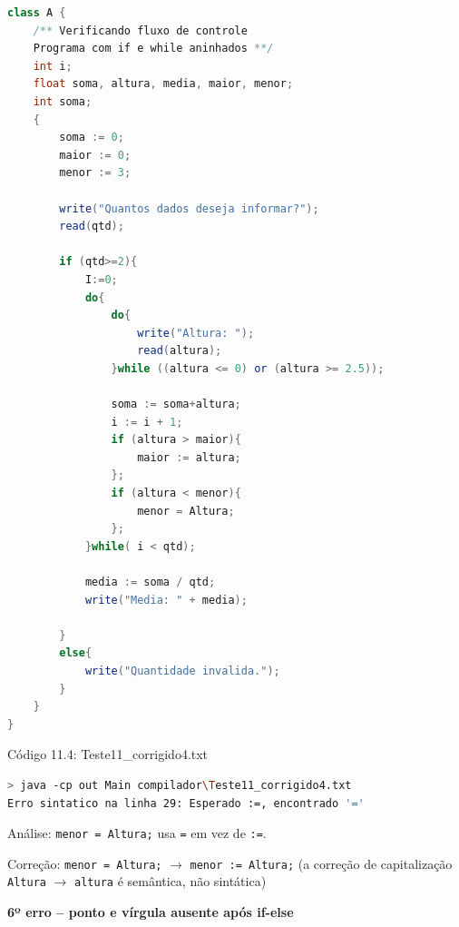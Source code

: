\documentclass[12pt,a4paper]{article}
\begin{document}
\begin{lstlisting}[language=Java]
class A {
    /** Verificando fluxo de controle
    Programa com if e while aninhados **/
    int i;
    float soma, altura, media, maior, menor;
    int soma;
    {
        soma := 0;
        maior := 0;
        menor := 3;

        write("Quantos dados deseja informar?");
        read(qtd);

        if (qtd>=2){
            I:=0;
            do{
                do{
                    write("Altura: ");
                    read(altura);
                }while ((altura <= 0) or (altura >= 2.5));

                soma := soma+altura;
                i := i + 1;
                if (altura > maior){
                    maior := altura;
                };
                if (altura < menor){
                    menor = Altura;
                };
            }while( i < qtd);

            media := soma / qtd;
            write("Media: " + media);

        }
        else{
            write("Quantidade invalida.");
        }
    }
}
\end{lstlisting}

Código 11.4: Teste11\_corrigido4.txt

\begin{lstlisting}[language=bash]
> java -cp out Main compilador\Teste11_corrigido4.txt
Erro sintatico na linha 29: Esperado :=, encontrado '='
\end{lstlisting}

Análise: \texttt{menor = Altura;} usa \texttt{=} em vez de \texttt{:=}.

Correção: \texttt{menor = Altura;} $\to$ \texttt{menor := Altura;} (a correção de capitalização \texttt{Altura} $\to$ \texttt{altura} é semântica, não sintática)

\textbf{6º erro -- ponto e vírgula ausente após if-else}
\end{document}
